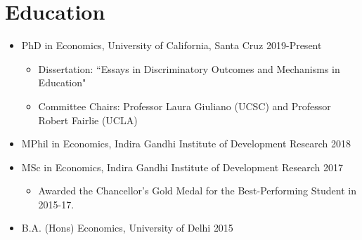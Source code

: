 \documentclass[letter,10pt]{article}
\newcommand{\dateright}[1]{\hfill{\small #1}}
\begin{document}
\thispagestyle{firstpage} %
\section{Education}
\begin{itemize}
    \item PhD in Economics, University of California, Santa Cruz \dateright{2019-Present}
        \begin{itemize}
            \item Dissertation: ``Essays in Discriminatory Outcomes and Mechanisms in Education"
            \item Committee Chairs: Professor Laura Giuliano (UCSC) and Professor Robert Fairlie (UCLA)
        \end{itemize}
    \item MPhil in Economics, Indira Gandhi Institute of Development Research \dateright{2018}
    \item MSc in Economics, Indira Gandhi Institute of Development Research \dateright{2017}
    \begin{itemize}
            \item Awarded the Chancellor's Gold Medal for the Best-Performing Student in 2015-17.
        \end{itemize}
    \item B.A. (Hons) Economics, University of Delhi \dateright{2015}
\end{itemize}
\end{document}
